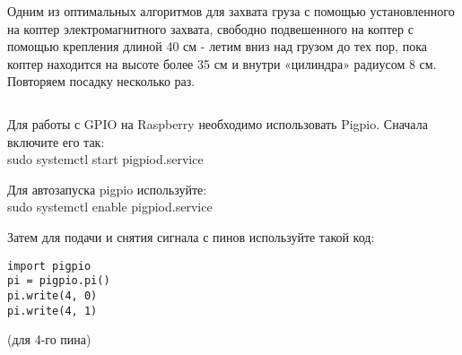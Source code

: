 Одним из оптимальных алгоритмов для захвата груза с помощью установленного на коптер электромагнитного захвата, свободно подвешенного на коптер с помощью крепления длиной 40 см - летим вниз над грузом до тех пор, пока коптер находится на высоте более 35 см и внутри «цилиндра» радиусом 8 см. Повторяем посадку несколько раз.

\inputminted[fontsize=\footnotesize, linenos]{python}{final/command_tour/ats/task_08/source_5.py}

Для работы с GPIO на Raspberry необходимо использовать Pigpio. Сначала включите его так:\\
sudo systemctl start pigpiod.service
 
Для автозапуска pigpio используйте:\\
sudo systemctl enable pigpiod.service

Затем для подачи и снятия сигнала с пинов используйте такой код:

\begin{verbatim}
import pigpio
pi = pigpio.pi()
pi.write(4, 0)
pi.write(4, 1)
\end{verbatim}

(для 4-го пина)